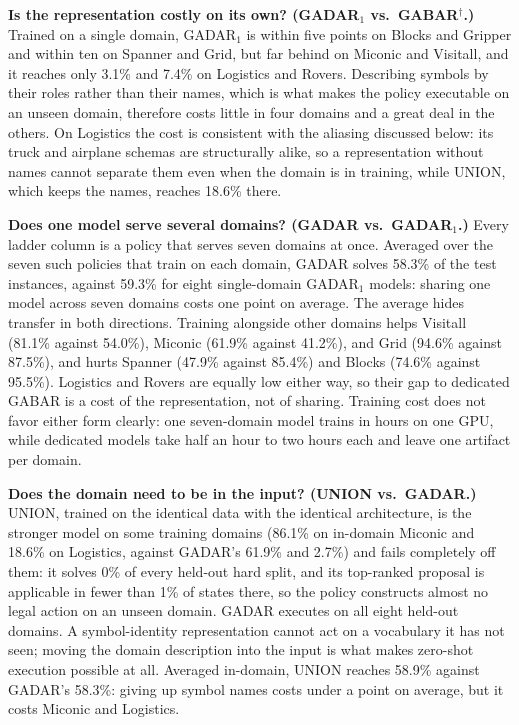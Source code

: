\documentclass{article} %
\newcommand{\gadar}{GADAR}                 %
\newcommand{\union}{UNION}                 %
\newcommand{\todonum}[1]{#1}
\begin{document}
\textbf{Is the representation costly on its own? (\gadar{}$_1$ vs.\ GABAR$^\dagger$.)}
Trained on a single domain, \gadar{}$_1$ is within five
points on Blocks and Gripper and within ten on Spanner and Grid, but far
behind on Miconic and Visitall, and it reaches only 3.1\% and 7.4\% on
Logistics and Rovers. Describing symbols by their roles rather than their
names, which is what makes the policy executable on an unseen domain,
therefore costs little in four domains and a great deal in the others. On
Logistics the cost is consistent with the aliasing discussed below: its
truck and airplane schemas are structurally alike, so a representation
without names cannot separate them even when the domain is in training,
while \union{}, which keeps the names, reaches 18.6\% there.

\textbf{Does one model serve several domains? (\gadar{} vs.\ \gadar{}$_1$.)}
Every ladder column is a policy that serves seven domains at once. Averaged
over the seven such policies that train on each domain, \gadar{} solves
58.3\% of the test instances, against 59.3\% for eight single-domain
\gadar{}$_1$ models: sharing one model across seven domains costs one point
on average. The average hides transfer in both directions. Training
alongside other domains helps Visitall (81.1\% against 54.0\%), Miconic
(61.9\% against 41.2\%), and Grid (94.6\% against 87.5\%), and hurts Spanner
(47.9\% against 85.4\%) and Blocks (74.6\% against 95.5\%). Logistics and
Rovers are equally low either way, so their gap to dedicated GABAR is a
cost of the representation, not of sharing. Training cost does not favor
either form clearly: one seven-domain model trains in hours on one GPU, while dedicated models take half an hour to two hours
each and leave one artifact per domain.

\textbf{Does the domain need to be in the input? (\union{} vs.\ \gadar{}.)}
\union{}, trained on the identical data with the identical architecture,
is the stronger model on some training domains (86.1\% on in-domain Miconic
and 18.6\% on Logistics, against \gadar{}'s 61.9\% and 2.7\%) and fails
completely off them: it solves \todonum{0}\% of every held-out hard split,
and its top-ranked proposal is applicable in fewer than \todonum{1}\% of
states there, so the policy constructs almost no legal action on an unseen
domain. \gadar{} executes on all eight held-out domains. A symbol-identity
representation cannot act on a vocabulary it has not seen; moving the domain
description into the input is what makes zero-shot execution possible at
all. Averaged in-domain, \union{} reaches 58.9\% against \gadar{}'s 58.3\%:
giving up symbol names costs under a point on average, but it costs
Miconic and Logistics.
\end{document}
